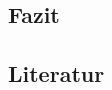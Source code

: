 \begin{spacing}{1}
	\chapter{Fazit}\label{chapter:fazit}
\end{spacing}

\begin{spacing}{1}
	\chapter{Literatur}\label{chapter:lit}
\end{spacing}

\newpage
{}
\setcounter{page}{\value{RPages}}

\glsnogroupskiptrue
\printglossary[title=Glossar,toctitle=Glossar] %
\listoffigures
\listoftables
\lstlistoflistings
\appendix
{}

